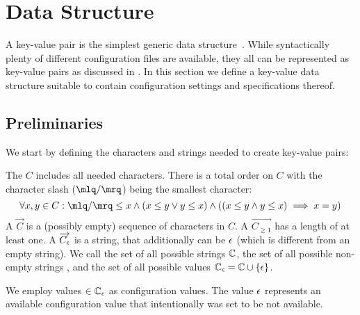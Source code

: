 \section{Data Structure}
\label{sec:keyset}
\label{sec:api-data-structure}

A key-value pair is the simplest generic data structure~\cite{strang2004context}.
While syntactically plenty of different configuration files are available, they all can be represented as key-value pairs as discussed in .
In this section we define a key-value data structure suitable to contain configuration settings and specifications thereof.

\subsection{Preliminaries}

We start by defining the characters and strings needed to create key-value pairs:

\begin{definition}
The  $C$ includes all needed characters.
\label{def:comparison}
There is a total order on $C$ with the character slash ($\mlq/\mrq$) being the smallest character:
\[
	\forall x,y \in C: \mlq/\mrq \leq x \land (x \leq y \lor y \leq x) \land ((x \leq y \land y \leq x) \implies x=y)
\]
A  $\overrightarrow{C}$ is a (possibly empty) sequence of characters in $C$.
A  $\overrightarrow{C_{\geq1}}$ has a length of at least one.
A  $\overrightarrow{C_\epsilon}$ is a string, that additionally can be $\epsilon$ (which is different from an empty string).
We call the set of all possible strings $\mathbb{C}$, the set of all possible non-empty strings \NonEmptyStrings, and the set of all possible values $\mathbb{C}_\epsilon = \mathbb{C} \cup \{\epsilon\}$.
\end{definition}

We employ values $\in \mathbb{C}_\epsilon$ as configuration values.
The value $\epsilon$ represents an available configuration value that intentionally was set to be not available.

